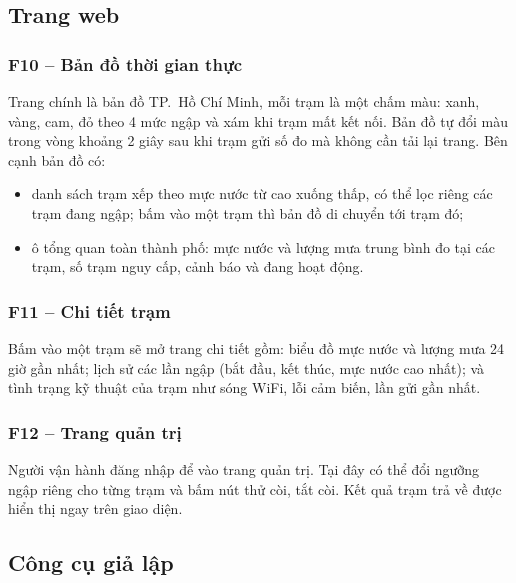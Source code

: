\documentclass[12pt,a4paper]{article}
\begin{document}
\subsection{Trang web}

\subsubsection{F10 -- Bản đồ thời gian thực}\label{sec:f10}
Trang chính là bản đồ TP.~Hồ Chí Minh, mỗi trạm là một chấm màu: xanh, vàng, cam, đỏ theo 4 mức ngập và xám khi trạm mất kết nối. Bản đồ tự đổi màu trong vòng khoảng 2 giây sau khi trạm gửi số đo mà không cần tải lại trang. Bên cạnh bản đồ có:
\begin{itemize}
  \item danh sách trạm xếp theo mực nước từ cao xuống thấp, có thể lọc riêng các trạm đang ngập; bấm vào một trạm thì bản đồ di chuyển tới trạm đó;
  \item ô tổng quan toàn thành phố: mực nước và lượng mưa trung bình đo tại các trạm, số trạm nguy cấp, cảnh báo và đang hoạt động.
\end{itemize}

\subsubsection{F11 -- Chi tiết trạm}\label{sec:f11}
Bấm vào một trạm sẽ mở trang chi tiết gồm: biểu đồ mực nước và lượng mưa 24 giờ gần nhất; lịch sử các lần ngập (bắt đầu, kết thúc, mực nước cao nhất); và tình trạng kỹ thuật của trạm như sóng WiFi, lỗi cảm biến, lần gửi gần nhất.

\subsubsection{F12 -- Trang quản trị}\label{sec:f12}
Người vận hành đăng nhập để vào trang quản trị. Tại đây có thể đổi ngưỡng ngập riêng cho từng trạm và bấm nút thử còi, tắt còi. Kết quả trạm trả về được hiển thị ngay trên giao diện.

\subsection{Công cụ giả lập}
\end{document}
